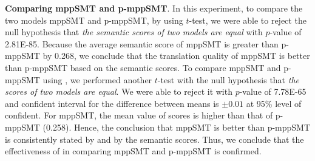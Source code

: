\textbf{Comparing mppSMT and p-mppSMT}. In this experiment, 
to compare the two models mppSMT and p-mppSMT, by using $t$-test, we
were able to reject the null hypothesis that \textit{the semantic
scores of two models are equal} with $p$-value of 2.81E-85. Because the average semantic score of mppSMT
is greater than p-mppSMT by 0.268, we conclude that the translation
quality of mppSMT is better than p-mppSMT based on the semantic
scores.
%
To compare mppSMT and p-mppSMT using {\model}, we performed another
$t$-test with the null hypothesis that \textit{the {\model} scores of
two models are equal}. We were able to reject it with $p$-value of
7.78E-65 and confident interval for the difference between means is $\pm0.01$ at 95\% level of confident. For mppSMT, the mean value of {\model} scores is higher than
that of p-mppSMT (0.258). Hence, the conclusion that mppSMT is better
than p-mppSMT is consistently stated by {\model} and by the semantic
scores.
Thus, we conclude that the effectiveness of {\model} in comparing
mppSMT and p-mppSMT is confirmed.

